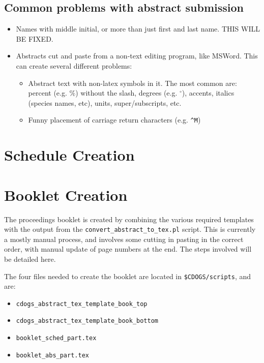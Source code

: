 \documentclass[letterpaper,12pt]{article}
\begin{document}
\subsection{Common problems with abstract submission}

\begin{itemize}
\item Names with middle initial, or more than just first and last
  name. THIS WILL BE FIXED.
\item Abstracts cut and paste from a non-text editing program, like
  MSWord. This can create several different problems:
  \begin{itemize}
  \item Abstract text with non-latex symbols in it. The most common
    are: percent (e.g. $\%$) without the slash, degrees
    (e.g. $^{\circ}$), accents, italics (species names, etc), units,
    super/subscripts, etc.
  \item Funny placement of carriage return characters (e.g. \verb|^M|)
  \end{itemize}

\end{itemize}

\section{Schedule Creation}

\section{Booklet Creation}

The proceedings booklet is created by combining the various required
templates with the output from the \verb|convert_abstract_to_tex.pl|
script. This is currently a mostly manual process, and involves some
cutting in pasting in the correct order, with manual update of page
numbers at the end. The steps involved will be detailed here.

The four files needed to create the booklet are located in
\verb|$CDOGS/scripts|, and are:
\begin{itemize}
\item \verb|cdogs_abstract_tex_template_book_top|
\item \verb|cdogs_abstract_tex_template_book_bottom|
\item \verb|booklet_sched_part.tex|
\item \verb|booklet_abs_part.tex|
\end{itemize}
\end{document}
